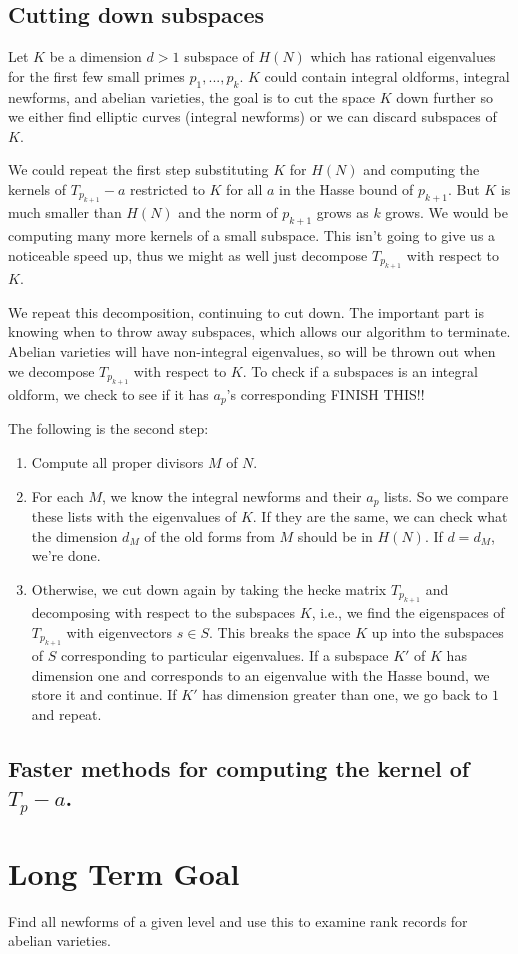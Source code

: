 \documentclass{article}
\begin{document}
\subsection{Cutting down subspaces}
Let $K$ be a dimension $d > 1$ subspace of $H(N)$ which has rational eigenvalues for the first few small primes $p_1,...,p_k$.  
$K$ could contain integral oldforms, integral newforms, and abelian varieties, 
the goal is to cut the space $K$ down further so we either find elliptic curves (integral newforms) or we can discard subspaces of $K$.  

We could repeat the first step substituting $K$ for $H(N)$ and computing the kernels of $T_{p_{k+1}} - a$ restricted to $K$ for all $a$ in the Hasse bound of $p_{k+1}$.  
But $K$ is much smaller than $H(N)$ and the norm of $p_{k+1}$ grows as $k$ grows.  
We would be computing many more kernels of a small subspace.  
This isn't going to give us a noticeable speed up, 
thus we might as well just decompose $T_{p_{k+1}}$ with respect to $K$. 

We repeat this decomposition, continuing to cut down.  
The important part is knowing when to throw away subspaces, 
which allows our algorithm to terminate.  
Abelian varieties will have non-integral eigenvalues, 
so will be thrown out when we decompose $T_{p_{k+1}}$ with respect to $K$.  
To check if a subspaces is an integral oldform, 
we check to see if it has $a_p$'s corresponding FINISH THIS!!

The following is the second step:

\begin{enumerate}
\item Compute all proper divisors $M$ of $N$.
\item For each $M$, we know the integral newforms and their $a_p$ lists.  
So we compare these lists with the eigenvalues of $K$.  
If they are the same, we can check what the dimension $d_M$ of the old forms from $M$ should be in $H(N)$.  
If $d = d_M$, we're done.
\item Otherwise, we cut down again by taking the hecke matrix $T_{p_{k+1}}$ and decomposing with respect to the subspaces $K$, 
i.e., we find the eigenspaces of $T_{p_{k+1}}$ with eigenvectors $s \in S$.  
This breaks the space $K$ up into the subspaces of $S$ corresponding to particular eigenvalues.
If a subspace $K'$ of $K$ has dimension one and corresponds to an eigenvalue with the Hasse bound, 
we store it and continue.  
If $K'$ has dimension greater than one, 
we go back to $1$ and repeat.
\end{enumerate}

\subsection{Faster methods for computing the kernel of $T_p - a$.}


\section{Long Term Goal}
Find all newforms of a given level and use this to examine rank records for abelian varieties.
\end{document}
